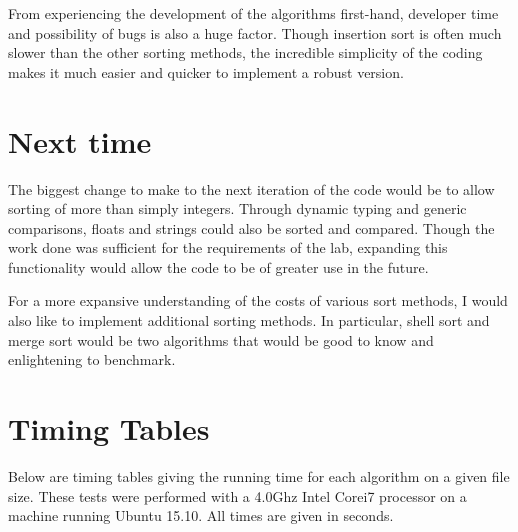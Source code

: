 \documentclass[a4paper,12pt]{article}
\begin{document}
From experiencing the development of the algorithms first-hand, developer time and possibility of bugs is also a huge factor.  Though insertion sort is often much slower than the other sorting methods, the incredible simplicity of the coding makes it much easier and quicker to implement a robust version.


\section{Next time}
The biggest change to make to the next iteration of the code would be to allow sorting of more than simply integers.  Through dynamic typing
and generic comparisons, floats and strings could also be sorted and compared.  Though the work done was sufficient for the requirements of the lab, expanding this functionality would allow the code to be of greater use in the future.  

For a more expansive understanding of the costs of various sort methods, I would also like to implement additional sorting methods.  In particular, shell sort and merge sort would be two algorithms that would be good to know and enlightening to benchmark.




\section{Timing Tables}

Below are timing tables giving the running time for each algorithm on a given file size.  These tests were performed with a 4.0Ghz Intel Corei7 processor on a machine running Ubuntu 15.10.  All times are given in seconds.
\end{document}
